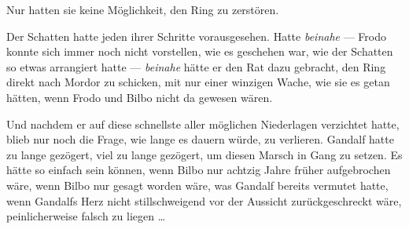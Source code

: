 Nur hatten sie keine Möglichkeit, den Ring zu zerstören.

Der Schatten hatte jeden ihrer Schritte vorausgesehen. Hatte \emph{beinahe} — Frodo konnte sich immer noch nicht vorstellen, wie es geschehen war, wie der Schatten so etwas arrangiert hatte — \emph{beinahe} hätte er den Rat dazu gebracht, den Ring direkt nach Mordor zu schicken, mit nur einer winzigen Wache, wie sie es getan hätten, wenn Frodo und Bilbo nicht da gewesen wären.

Und nachdem er auf diese schnellste aller möglichen Niederlagen verzichtet hatte, blieb nur noch die Frage, wie lange es dauern würde, zu verlieren. Gandalf hatte zu lange gezögert, viel zu lange gezögert, um diesen Marsch in Gang zu setzen. Es hätte so einfach sein können, wenn Bilbo nur achtzig Jahre früher aufgebrochen wäre, wenn Bilbo nur gesagt worden wäre, was Gandalf bereits vermutet hatte, wenn Gandalfs Herz nicht stillschweigend vor der Aussicht zurückgeschreckt wäre, peinlicherweise falsch zu liegen …

